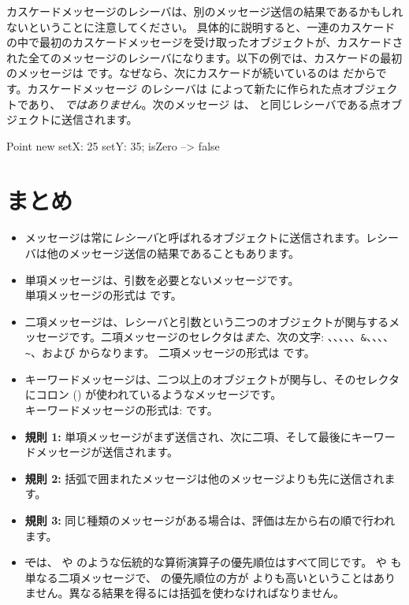 \documentclass[a4paper,10pt,twoside]{book}
\begin{document}
カスケードメッセージのレシーバは、別のメッセージ送信の結果であるかもしれないということに注意してください。
具体的に説明すると、一連のカスケードの中で最初のカスケードメッセージを受け取ったオブジェクトが、カスケードされた全てのメッセージのレシーバになります。以下の例では、カスケードの最初のメッセージは  です。なぜなら、次にカスケードが続いているのは  だからです。カスケードメッセージ  のレシーバは  によって新たに作られた点オブジェクトであり、 \emph{ではありません}。次のメッセージ  は、  と同じレシーバである点オブジェクトに送信されます。

\begin{code}{}
Point new setX: 25 setY: 35; isZero --> false
\end{code}

\section{まとめ}

\begin{itemize}
\item メッセージは常に\emph{レシーバ}と呼ばれるオブジェクトに送信されます。レシーバは他のメッセージ送信の結果であることもあります。

\item 単項メッセージは、引数を必要とないメッセージです。\\
単項メッセージの形式は です。

\item 二項メッセージは、レシーバと引数という二つのオブジェクトが関与するメッセージです。二項メッセージのセレクタは\emph{また}、次の文字: \ct{+}、\ct{-}、\ct{*}、\ct{/}、\ct{|}、\texttt{\&}、\ct{=}、\ct{>}、\ct{<}、\texttt{\~}、および  からなります。
二項メッセージの形式は です。
\item キーワードメッセージは、二つ以上のオブジェクトが関与し、そのセレクタにコロン (\ct{:}) が使われているようなメッセージです。\\
キーワードメッセージの形式は:
です。

\item \textbf{規則 1:} 単項メッセージがまず送信され、次に二項、そして最後にキーワードメッセージが送信されます。
\item \textbf{規則 2:} 括弧で囲まれたメッセージは他のメッセージよりも先に送信されます。
\item \textbf{規則 3:} 同じ種類のメッセージがある場合は、評価は左から右の順で行われます。
\item \st では、\ct{+} や \ct{*} のような伝統的な算術演算子の優先順位はすべて同じです。\ct{+} や \ct{*} も単なる二項メッセージで、\ct{*} の優先順位の方が \ct{+} よりも高いということはありません。異なる結果を得るには括弧を使わなければなりません。
\end{itemize}

\ifx\wholebook\relax\else
\end{document}
